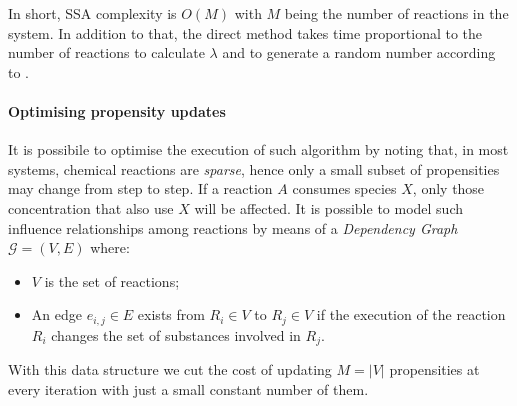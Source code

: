 In short, \ac{SSA} complexity is $O(M)$ with $M$ being the number of reactions
in the system. In addition to that, the direct method takes time proportional
to the number of reactions to calculate $\lambda$ and to generate a random number
according to .

\paragraph{Optimising propensity updates}
It is possibile to optimise the execution of such algorithm by noting that,
in most systems, chemical reactions are \emph{sparse}, hence only a small
subset of propensities may change from step to step. If a reaction
$A$ consumes species $X$, only those concentration that also use $X$ will be
affected. It is possible to model such influence relationships among reactions
by means of a \emph{Dependency Graph} $\mathcal{G} = (V, E)$ where:
\begin{itemize}
	\item $V$ is the set of reactions;
	\item An edge $e_{i,j} \in E$ exists from $R_i \in V$ to $R_j \in V$ if the
	      execution of the reaction $R_i$ changes the set of substances involved
	      in $R_j$.
\end{itemize}
With this data structure we cut the cost of updating $M = |V|$ propensities at
every iteration with just a small constant number of them.

